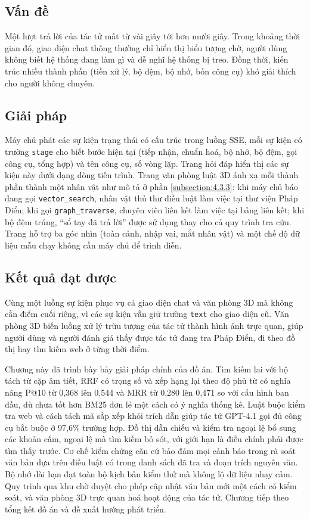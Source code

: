 \documentclass[../DoAn.tex]{subfiles}
\begin{document}
\subsection{Vấn đề}
Một lượt trả lời của tác tử mất từ vài giây tới hơn mười giây. Trong khoảng thời gian đó, giao diện chat thông thường chỉ hiển thị biểu tượng chờ, người dùng không biết hệ thống đang làm gì và dễ nghĩ hệ thống bị treo. Đồng thời, kiến trúc nhiều thành phần (tiền xử lý, bộ đệm, bộ nhớ, bốn công cụ) khó giải thích cho người không chuyên.

\subsection{Giải pháp}
Máy chủ phát các sự kiện trạng thái có cấu trúc trong luồng SSE, mỗi sự kiện có trường \texttt{stage} cho biết bước hiện tại (tiếp nhận, chuẩn hoá, bộ nhớ, bộ đệm, gọi công cụ, tổng hợp) và tên công cụ, số vòng lặp. Trang hỏi đáp hiển thị các sự kiện này dưới dạng dòng tiến trình. Trang văn phòng luật 3D ánh xạ mỗi thành phần thành một nhân vật như mô tả ở phần \ref{subsection:4.3.3}: khi máy chủ báo đang gọi \texttt{vector\_search}, nhân vật thủ thư điều luật làm việc tại thư viện Pháp Điển; khi gọi \texttt{graph\_traverse}, chuyên viên liên kết làm việc tại bảng liên kết; khi bộ đệm trúng, ``sổ tay đã trả lời'' được sử dụng thay cho cả quy trình tra cứu. Trang hỗ trợ ba góc nhìn (toàn cảnh, nhập vai, mắt nhân vật) và một chế độ dữ liệu mẫu chạy không cần máy chủ để trình diễn.

\subsection{Kết quả đạt được}
Cùng một luồng sự kiện phục vụ cả giao diện chat và văn phòng 3D mà không cần điểm cuối riêng, vì các sự kiện vẫn giữ trường \texttt{text} cho giao diện cũ. Văn phòng 3D biến luồng xử lý trừu tượng của tác tử thành hình ảnh trực quan, giúp người dùng và người đánh giá thấy được tác tử đang tra Pháp Điển, đi theo đồ thị hay tìm kiếm web ở từng thời điểm.

Chương này đã trình bày bảy giải pháp chính của đồ án. Tìm kiếm lai với bộ tách từ cặp âm tiết, RRF có trọng số và xếp hạng lại theo độ phủ từ có nghĩa nâng P@10 từ 0,368 lên 0,544 và MRR từ 0,280 lên 0,471 so với cấu hình ban đầu, dù chưa tốt hơn BM25 đơn lẻ một cách có ý nghĩa thống kê. Luật buộc kiểm tra web và cách tách mã sắp xếp khỏi trích dẫn giúp tác tử GPT-4.1 gọi đủ công cụ bắt buộc ở 97,6\% trường hợp. Đồ thị dẫn chiếu và kiểm tra ngoại lệ bổ sung các khoản cấm, ngoại lệ mà tìm kiếm bỏ sót, với giới hạn là điều chính phải được tìm thấy trước. Cơ chế kiểm chứng căn cứ bảo đảm mọi cảnh báo trong rà soát văn bản dựa trên điều luật có trong danh sách đã tra và đoạn trích nguyên văn. Bộ nhớ dài hạn đạt toàn bộ kịch bản kiểm thử mà không lộ dữ liệu nhạy cảm. Quy trình qua khu chờ duyệt cho phép cập nhật văn bản mới một cách có kiểm soát, và văn phòng 3D trực quan hoá hoạt động của tác tử. Chương tiếp theo tổng kết đồ án và đề xuất hướng phát triển.
\end{document}
